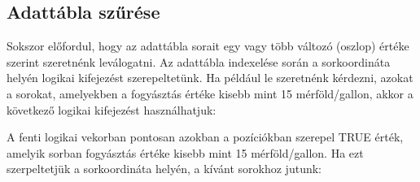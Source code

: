 \documentclass[
]{book}
\newenvironment{Shaded}{\begin{snugshade}}{\end{snugshade}}
\newcommand{\CommentTok}[1]{\textcolor[rgb]{0.56,0.35,0.01}{\textit{#1}}}
\newcommand{\DecValTok}[1]{\textcolor[rgb]{0.00,0.00,0.81}{#1}}
\newcommand{\NormalTok}[1]{#1}
\newcommand{\SpecialCharTok}[1]{\textcolor[rgb]{0.00,0.00,0.00}{#1}}
\begin{document}
\hypertarget{adattuxe1bla-szux171ruxe9se}{%
\subsection{Adattábla szűrése}\label{adattuxe1bla-szux171ruxe9se}}

Sokszor előfordul, hogy az adattábla sorait egy vagy több változó (oszlop) értéke szerint szeretnénk leválogatni. Az adattábla indexelése során a sorkoordináta helyén logikai kifejezést szerepeltetünk. Ha például le szeretnénk kérdezni, azokat a sorokat, amelyekben a fogyásztás értéke kisebb mint 15 mérföld/gallon, akkor a következő logikai kifejezést használhatjuk:

\begin{Shaded}
\end{Shaded}

A fenti logikai vekorban pontosan azokban a pozíciókban szerepel TRUE érték, amelyik sorban fogyásztás értéke kisebb mint 15 mérföld/gallon. Ha ezt szerpeltetjük a sorkoordináta helyén, a kívánt sorokhoz jutunk:

\begin{Shaded}
\end{Shaded}
\end{document}
